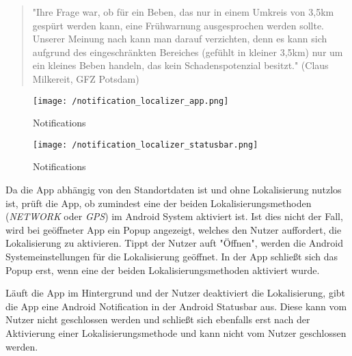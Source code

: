 \par\bigskip
\begin{quote}
"Ihre Frage war, ob für ein Beben, das nur in einem Umkreis von 3,5km gespürt werden kann, eine Frühwarnung ausgesprochen werden sollte. Unserer Meinung nach kann man darauf verzichten, denn es kann sich aufgrund des eingeschränkten Bereiches (gefühlt in kleiner 3,5km) nur um ein kleines Beben handeln, das kein Schadenspotenzial besitzt."\newline
(Claus Milkereit, GFZ Potsdam)
\end{quote}
\newpage
\begin{wrapfigure}{r}{50mm}
	\centering
	\label{notification_localizer_app}{
    \texttt{[image: /notification\_localizer\_app.png]}}
    \vspace*{-2mm}
    \caption[Lokalisierung: Notification in der App]{Notifications}
	\vspace*{5mm}
	\label{notification_localizer_statusbar}{
    \texttt{[image: /notification\_localizer\_statusbar.png]}}
    \vspace*{-2mm}
    \caption[Lokalisierung: Notification bei geschlossener App]{Notifications}
    \vspace*{-10mm}
\end{wrapfigure}
Da die App abhängig von den Standortdaten ist und ohne Lokalisierung nutzlos ist, prüft die App, ob zumindest eine der beiden Lokalisierungsmethoden (\textit{NETWORK} oder \textit{GPS}) im Android System aktiviert ist. Ist dies nicht der Fall, wird bei geöffneter App ein Popup angezeigt, welches den Nutzer auffordert, die  Lokalisierung zu aktivieren. Tippt der Nutzer auft "Öffnen", werden die Android Systemeinstellungen für die Lokalisierung geöffnet. In der App schließt sich das Popup erst, wenn eine der beiden Lokalisierungsmethoden aktiviert wurde. 
\par\bigskip
Läuft die App im Hintergrund und der Nutzer deaktiviert die Lokalisierung, gibt die App eine Android Notification in der Android Statusbar aus. Diese kann vom Nutzer nicht geschlossen werden und schließt sich ebenfalls erst nach der Aktivierung einer Lokalisierungsmethode und kann nicht vom Nutzer geschlossen werden.

